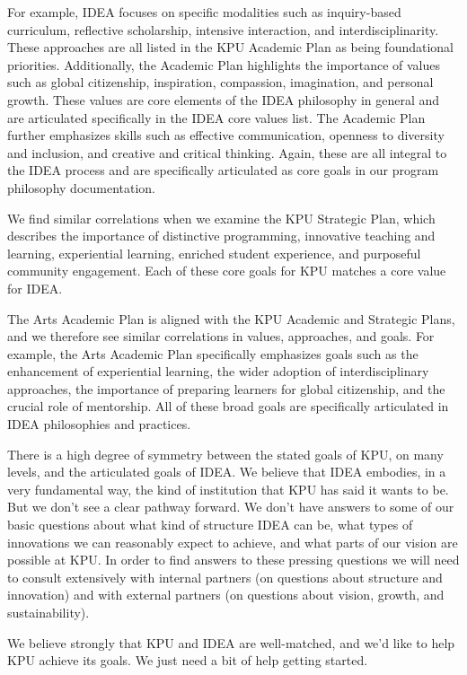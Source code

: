 \documentclass[11pt, letterpaper]{article}
\begin{document}
For example, IDEA focuses on specific modalities such as inquiry-based
curriculum, reflective scholarship, intensive interaction, and
interdisciplinarity. These approaches are all listed in the KPU Academic
Plan as being foundational priorities. Additionally, the Academic Plan
highlights the importance of values such as global citizenship,
inspiration, compassion, imagination, and personal growth. These values
are core elements of the IDEA philosophy in general and are articulated
specifically in the IDEA core values list. The Academic Plan further
emphasizes skills such as effective communication, openness to diversity
and inclusion, and creative and critical thinking. Again, these are all
integral to the IDEA process and are specifically articulated as core
goals in our program philosophy documentation.

We find similar correlations when we examine the KPU Strategic Plan,
which describes the importance of distinctive programming, innovative
teaching and learning, experiential learning, enriched student
experience, and purposeful community engagement. Each of these core
goals for KPU matches a core value for IDEA.

The Arts Academic Plan is aligned with the KPU Academic and Strategic
Plans, and we therefore see similar correlations in values, approaches,
and goals. For example, the Arts Academic Plan specifically emphasizes
goals such as the enhancement of experiential learning, the wider
adoption of interdisciplinary approaches, the importance of preparing
learners for global citizenship, and the crucial role of mentorship. All
of these broad goals are specifically articulated in IDEA philosophies
and practices.

There is a high degree of symmetry between the stated goals of KPU, on
many levels, and the articulated goals of IDEA. We believe that IDEA
embodies, in a very fundamental way, the kind of institution that KPU
has said it wants to be. But we don't see a clear pathway forward. We don't have answers to some of our basic questions about what kind of structure IDEA can be, what types of innovations we can reasonably expect to achieve, and what parts of our vision are possible at KPU. In order to find answers to these pressing questions we will need to consult extensively with internal partners (on questions about structure and innovation) and with external partners (on questions about vision, growth, and sustainability).   

We believe strongly that KPU and IDEA are well-matched, and we'd like to help KPU achieve its goals. We just need a bit of help getting started.
\end{document}
